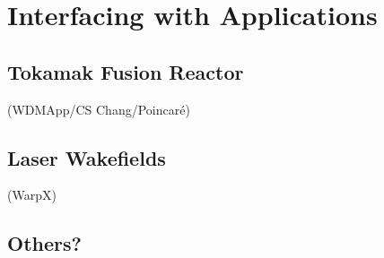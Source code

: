 \section{Interfacing with Applications}

\subsection{Tokamak Fusion Reactor}


(WDMApp/CS Chang/Poincar\'{e})

\subsection{Laser Wakefields}


(WarpX)

\subsection{Others?}

